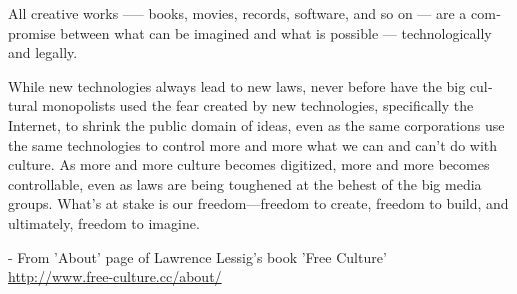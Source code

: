 \newpage
\begin{english}
All creative works --— books, movies, records, software, and so on --- are a compromise between what can be imagined and what is possible --- technologically and legally.

While new technologies always lead to new laws, never before have the big cultural monopolists used the fear created by new technologies, specifically the Internet, to shrink the public domain of ideas, even as the same corporations use the same technologies to control more and more what we can and can’t do with culture. As more and more culture becomes digitized, more and more becomes controllable, even as laws are being toughened at the behest of the big media groups. What’s at stake is our freedom—freedom to create, freedom to build, and ultimately, freedom to imagine.
\begin{flushright}- From 'About' page of Lawrence Lessig's book 'Free Culture'\\
\url{http://www.free-culture.cc/about/}\end{flushright}
\end{english}
